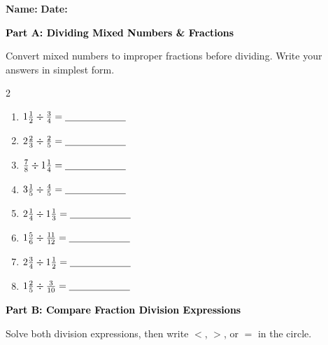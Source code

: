 \documentclass[12pt, letterpaper, fleqn]{article}
\newcommand{\blank}{\underline{\hspace{2.2cm}}}
\begin{document}
\textbf{Name:} \underline{\hspace{5cm}}
\hfill
\textbf{Date:} \underline{\hspace{3cm}}\\

\begin{tcolorbox}[colback=black!10]
    \large\textcolor{black}{\textbf{Part A: Dividing Mixed Numbers \& Fractions}}
\end{tcolorbox}

\vspace{3mm}
\noindent
Convert mixed numbers to improper fractions before dividing. Write your answers in simplest form.

\vspace{5mm}
\begin{multicols}{2}
\begin{enumerate}[itemsep=3cm, leftmargin=0.6cm]
\item $1\frac{1}{2} \div \frac{3}{4} = \blank$
\item $2\frac{2}{3} \div \frac{2}{5} = \blank$
\item $\frac{7}{8} \div 1\frac{1}{4} = \blank$
\item $3\frac{1}{5} \div \frac{4}{5} = \blank$
\item $2\frac{1}{4} \div 1\frac{1}{3} = \blank$
\item $1\frac{5}{6} \div \frac{11}{12} = \blank$
\item $2\frac{3}{4} \div 1\frac{1}{2} = \blank$
\item $1\frac{2}{5} \div \frac{3}{10} = \blank$

\end{enumerate}
\end{multicols}
\newpage

\begin{tcolorbox}[colback=black!10]
    \large\textcolor{black}{\textbf{Part B: Compare Fraction Division Expressions}}
\end{tcolorbox}

\vspace{3mm}
\noindent
Solve both division expressions, then write $<$, $>$, or $=$ in the circle.
\end{document}
